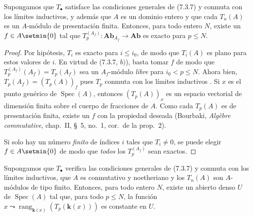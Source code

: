 \begin{corollary}[7.3.9]
\label{III.7.3.9}
Supongamos que $T_\bullet$ satisface las condiciones generales de \textup{(7.3.7)} y conmuta con los límites inductivos, y además que $A$ es un dominio entero y que cada $T_n(A)$ es un
$A$-módulo de presentación finita. Entonces, para todo entero $N$,
existe un $f\in A\setmin\{0\}$ tal que
$T_p^{(A_f)}:\boldsymbol{Ab}_{A_f}\longrightarrow\boldsymbol{Ab}$
es exacto para $p\leq N$.
\end{corollary}

\begin{proof}
Por hipótesis, $T_i$ es exacto para $i\leq i_0$, de modo que
$T_i(A)$ es plano para estos valores de $i$. En virtud de (7.3.7, $b)$), basta tomar $f$ de modo que
$T_p^{(A_f)}(A_f)=T_p(A_f)$
sea un $A_f$-módulo \emph{libre} para $i_0<p\leq N$. Ahora bien,
$T_p(A_f)=(T_p(A))_f$
pues $T_p$ conmuta con los límites inductivos . Si
$x$ es el punto genérico de $\operatorname{Spec}(A)$, entonces
$(T_p(A))_x$ es un espacio vectorial de dimensión finita
sobre el cuerpo de fracciones de $A$. Como cada $T_p(A)$ es de
presentación finita, existe un $f$ con la propiedad deseada
(Bourbaki, \emph{Alg\`ebre commutative}, chap.~II, \S~5,
no.~1, cor.\ de la prop.~2).

Si solo hay un número \emph{finito} de índices $i$ tales que $T_i\ne0$,
se puede elegir $f\in A\setmin\{0\}$ de modo que \emph{todos} los
$T_p^{(A_f)}$ sean exactos.
\end{proof}

\begin{corollary}[7.3.10]
Supongamos que $T_\bullet$ verifica las condiciones generales de \textup{(7.3.7)} y
conmuta con los límites inductivos, que $A$ es conmutativo y noetheriano y los
$T_n(A)$ son $A$-módulos de tipo finito. Entonces, para todo entero $N$, existe
un abierto denso $U$ de $\operatorname{Spec}(A)$ tal que, para todo $p\leq N$,
la función
$x\leadsto\operatorname{rang}_{\mathbf{k}(x)}(T_p(\boldsymbol{k}(x)))$
es constante en $U$.
\end{corollary}

